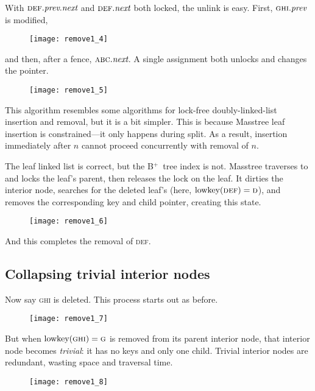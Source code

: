 \documentclass[11pt]{article}
\newcommand{\V}[1]{\textit{#1}}
\newcommand{\N}[1]{\text{#1}}
\newcommand{\Bplus}{B\(^+\)}
\newcommand{\ITEM}[1]{\textsc{#1}}
\begin{document}
\noindent%
With \(\ITEM{def}.\V{prev}.\V{next}\) and \(\ITEM{def}.\V{next}\) both
locked, the unlink is easy. First, \(\ITEM{ghi}.\V{prev}\) is modified,

\begin{figure}[H]
\texttt{[image: remove1\_4]}
\end{figure}

\noindent%
and then, after a fence, \(\ITEM{abc}.\V{next}\). A single assignment
both unlocks and changes the pointer.

\begin{figure}[H]
\texttt{[image: remove1\_5]}
\end{figure}

\noindent%
This algorithm resembles some algorithms for lock-free
doubly-linked-list insertion and removal, but it is a bit simpler. This
is because Masstree leaf insertion is constrained---it only happens
during split. As a result, insertion immediately after \(n\) cannot
proceed concurrently with removal of \(n\).

The leaf linked list is correct, but the \Bplus\ tree index is not.
Masstree traverses to and locks the leaf's parent, then releases the
lock on the leaf. It dirties the interior node, searches for the deleted
leaf's \N{lowkey} (here, \(\N{lowkey}(\ITEM{def}) = \ITEM{d}\)), and removes
the corresponding key and child pointer, creating this state.

\begin{figure}[H]
\texttt{[image: remove1\_6]}
\end{figure}

And this completes the removal of \ITEM{def}.

\subsection{Collapsing trivial interior nodes}

Now say \ITEM{ghi} is deleted. This process starts out as before.

\begin{figure}[H]
\texttt{[image: remove1\_7]}
\end{figure}

\noindent%
But when \(\N{lowkey}(\ITEM{ghi}) = \ITEM{g}\) is removed from its
parent interior node, that interior node becomes \emph{trivial}: it has
no keys and only one child. Trivial interior nodes are redundant,
wasting space and traversal time.

\begin{figure}[H]
\texttt{[image: remove1\_8]}
\end{figure}
\end{document}
